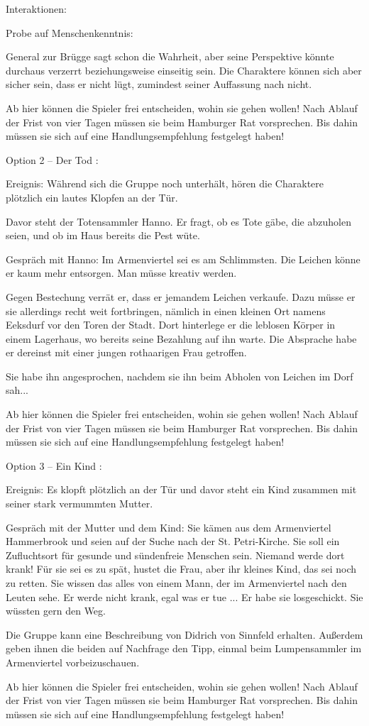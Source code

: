 Interaktionen:

Probe auf Menschenkenntnis:

General zur Brügge sagt schon die Wahrheit, aber seine Perspektive könnte durchaus verzerrt beziehungsweise einseitig sein.
Die Charaktere können sich aber sicher sein, dass er nicht lügt, zumindest seiner Auffassung nach nicht.

Ab hier können die Spieler frei entscheiden, wohin sie gehen wollen! Nach Ablauf der Frist von vier Tagen müssen sie beim Hamburger Rat vorsprechen. Bis dahin müssen sie sich auf eine Handlungsempfehlung festgelegt haben!


Option 2 – Der Tod
:

Ereignis: Während sich die Gruppe noch unterhält, hören die Charaktere plötzlich ein lautes Klopfen an der Tür.

Davor steht der Totensammler Hanno. Er fragt, ob es Tote gäbe, die abzuholen seien, und ob im Haus bereits die Pest wüte.

Gespräch mit Hanno: Im Armenviertel sei es am Schlimmsten. Die Leichen könne er kaum mehr entsorgen. Man müsse kreativ werden.

Gegen Bestechung verrät er, dass er jemandem Leichen verkaufe. Dazu müsse er sie allerdings recht weit fortbringen, nämlich in einen kleinen Ort namens Eeksdurf vor den Toren der Stadt. Dort hinterlege er die leblosen Körper in einem Lagerhaus, wo bereits seine Bezahlung auf ihn warte. Die Absprache habe er dereinst mit einer jungen rothaarigen Frau getroffen.

Sie habe ihn angesprochen, nachdem sie ihn beim Abholen von Leichen im Dorf sah...


Ab hier können die Spieler frei entscheiden, wohin sie gehen wollen! Nach Ablauf der Frist von vier Tagen müssen sie beim Hamburger Rat vorsprechen. Bis dahin müssen sie sich auf eine Handlungsempfehlung festgelegt haben!


Option 3 – Ein Kind
:

Ereignis: Es klopft plötzlich an der Tür und davor steht ein Kind zusammen mit seiner stark vermummten Mutter.

Gespräch mit der Mutter und dem Kind: Sie kämen aus dem Armenviertel Hammerbrook und seien auf der Suche nach der St. Petri-Kirche. Sie soll ein Zufluchtsort für gesunde und sündenfreie Menschen sein. Niemand werde dort krank! Für sie sei es zu spät, hustet die Frau, aber ihr kleines Kind, das sei noch zu retten. Sie wissen das alles von einem Mann, der im Armenviertel nach den Leuten sehe. Er werde nicht krank, egal was er tue ... Er habe sie losgeschickt. Sie wüssten gern den Weg.

Die Gruppe kann eine Beschreibung von Didrich von Sinnfeld erhalten. Außerdem geben ihnen die beiden auf Nachfrage den Tipp, einmal beim Lumpensammler im Armenviertel vorbeizuschauen.


Ab hier können die Spieler frei entscheiden, wohin sie gehen wollen! Nach Ablauf der Frist von vier Tagen müssen sie beim Hamburger Rat vorsprechen. Bis dahin müssen sie sich auf eine Handlungsempfehlung festgelegt haben!
